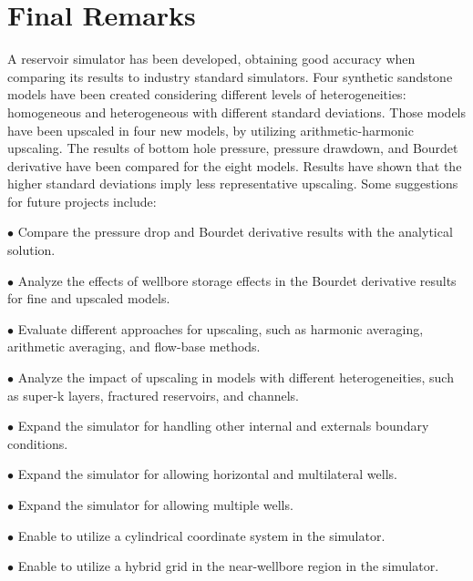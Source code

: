 \chapter{Final Remarks}
A reservoir simulator has been developed, obtaining good accuracy when comparing its results to industry standard simulators. Four synthetic sandstone models have been created considering different levels of heterogeneities: homogeneous and heterogeneous with different standard deviations. Those models have been upscaled in four new models, by utilizing arithmetic-harmonic upscaling. The results of bottom hole pressure, pressure drawdown, and Bourdet derivative have been compared for the eight models. Results have shown that the higher standard deviations imply less representative upscaling. Some suggestions for future projects include: 

$\bullet$ Compare the pressure drop and Bourdet derivative results with the analytical solution.

$\bullet$ Analyze the effects of wellbore storage effects in the Bourdet derivative results for fine and upscaled models.

$\bullet$ Evaluate different approaches for upscaling, such as harmonic averaging, arithmetic averaging, and flow-base methods.

$\bullet$ Analyze the impact of upscaling in models with different heterogeneities, such as super-k layers, fractured reservoirs, and channels.

$\bullet$ Expand the simulator for handling other internal and externals boundary conditions.

$\bullet$ Expand the simulator for allowing horizontal and multilateral wells.

$\bullet$ Expand the simulator for allowing multiple wells.

$\bullet$ Enable to utilize a cylindrical coordinate system in the simulator. 

$\bullet$ Enable to utilize a hybrid grid in the near-wellbore region in the simulator. 

